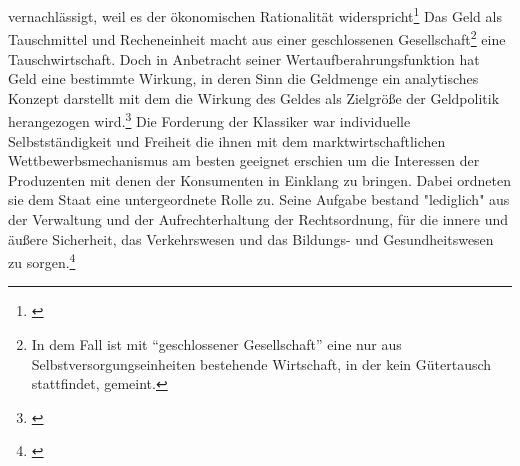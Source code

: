 vernachlässigt, weil es der ökonomischen Rationalität widerspricht\footnote[108]{\citep[S.53]{bombach1981theorie}} Das Geld als Tauschmittel und Recheneinheit macht aus einer geschlossenen Gesellschaft\footnote[109]{In dem Fall ist mit "`geschlossener Gesellschaft"' eine nur aus Selbstversorgungseinheiten bestehende Wirtschaft, in der kein Gütertausch stattfindet, gemeint.} eine Tauschwirtschaft. Doch in Anbetracht seiner Wertaufberahrungsfunktion hat Geld eine bestimmte Wirkung, in deren Sinn die Geldmenge ein analytisches Konzept darstellt mit dem die Wirkung des Geldes als Zielgröße der Geldpolitik herangezogen wird.\footnote[110]{\citep[S.421]{Basseler2010}} Die Forderung der Klassiker war individuelle Selbstständigkeit und Freiheit die ihnen mit dem marktwirtschaftlichen Wettbewerbsmechanismus am besten geeignet erschien um die Interessen der Produzenten mit denen der Konsumenten in Einklang zu bringen. Dabei ordneten sie dem Staat eine untergeordnete Rolle zu. Seine Aufgabe bestand "lediglich" aus der Verwaltung und der Aufrechterhaltung der Rechtsordnung, für die innere und äußere Sicherheit, das Verkehrswesen und das Bildungs- und Gesundheitswesen zu sorgen.\footnote[111]{\citep[S.60f]{Basseler2010}}
